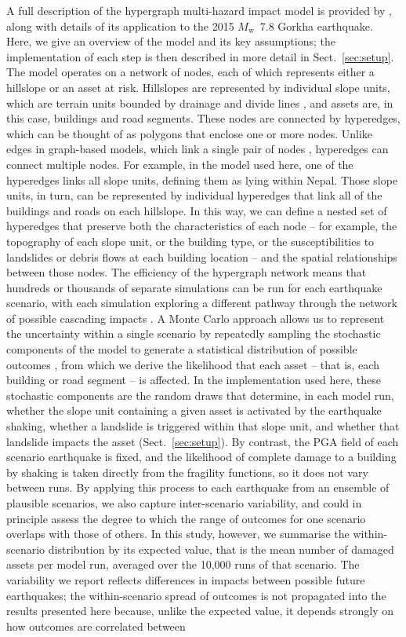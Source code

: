 \documentclass[nhess, manuscript]{copernicus}
\begin{document}
A full description of the hypergraph multi-hazard impact model is provided by \citet{Dunant2025}, along with details of its application to the 2015 $M_{\mathrm{w}}$~7.8 Gorkha earthquake. Here, we give an overview of the model and its key assumptions; the implementation of each step is then described in more detail in Sect.~\ref{sec:setup}. The model operates on a network of nodes, each of which represents either a hillslope or an asset at risk. Hillslopes are represented by individual slope units, which are terrain units bounded by drainage and divide lines \citep{Alvioli2016}, and assets are, in this case, buildings and road segments. These nodes are connected by hyperedges, which can be thought of as polygons that enclose one or more nodes. Unlike edges in graph-based models, which link a single pair of nodes \citep{Dunant2021}, hyperedges can connect multiple nodes. For example, in the model used here, one of the hyperedges links all slope units, defining them as lying within Nepal. Those slope units, in turn, can be represented by individual hyperedges that link all of the buildings and roads on each hillslope. In this way, we can define a nested set of hyperedges that preserve both the characteristics of each node -- for example, the topography of each slope unit, or the building type, or the susceptibilities to landslides or debris flows at each building location -- and the spatial relationships between those nodes. The efficiency of the hypergraph network means that hundreds or thousands of separate simulations can be run for each earthquake scenario, with each simulation exploring a different pathway through the network of possible cascading impacts \citep{Dunant2025}. A Monte Carlo approach allows us to represent the uncertainty within a single scenario by repeatedly sampling the stochastic components of the model to generate a statistical distribution of possible outcomes \citep{dunant2021multihazards}, from which we derive the likelihood that each asset -- that is, each building or road segment -- is affected. In the implementation used here, these stochastic components are the random draws that determine, in each model run, whether the slope unit containing a given asset is activated by the earthquake shaking, whether a landslide is triggered within that slope unit, and whether that landslide impacts the asset (Sect.~\ref{sec:setup}). By contrast, the PGA field of each scenario earthquake is fixed, and the likelihood of complete damage to a building by shaking is taken directly from the fragility functions, so it does not vary between runs. By applying this process to each earthquake from an ensemble of plausible scenarios, we also capture inter-scenario variability, and could in principle assess the degree to which the range of outcomes for one scenario overlaps with those of others. In this study, however, we summarise the within-scenario distribution by its expected value, that is the mean number of damaged assets per model run, averaged over the 10,000 runs of that scenario. The variability we report reflects differences in impacts between possible future earthquakes; the within-scenario spread of outcomes is not propagated into the results presented here because, unlike the expected value, it depends strongly on how outcomes are correlated between 
\end{document}
